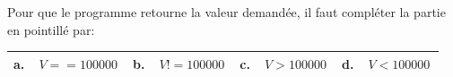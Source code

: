 \documentclass[10pt]{article}
\providecommand{\np}[2][]{{#2~#1}}
\begin{document}
Pour que le programme retourne la valeur demandée, il faut compléter la partie en pointillé par:

\begin{center}
\begin{tabularx}{\linewidth}{|*{4}{X|}}\hline
\textbf{a.~~}$V = = \np{100000}$ &\textbf{b.~~}$V!= \np{100000}$&\textbf{c.~~}$V > \np{100000}$&\textbf{d.~~}$ V < \np{100000}$\\ \hline
\end{tabularx}
\end{center}

\bigskip
\end{document}
